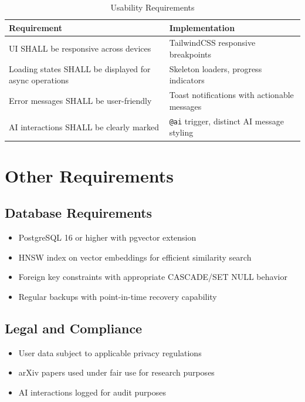 \documentclass[11pt,a4paper]{article}
\begin{document}
\begin{table}[H]
\centering
\begin{tabular}{p{5cm}p{8cm}}
\toprule
\textbf{Requirement} & \textbf{Implementation} \\
\midrule
UI SHALL be responsive across devices & TailwindCSS responsive breakpoints \\
Loading states SHALL be displayed for async operations & Skeleton loaders, progress indicators \\
Error messages SHALL be user-friendly & Toast notifications with actionable messages \\
AI interactions SHALL be clearly marked & \texttt{@ai} trigger, distinct AI message styling \\
\bottomrule
\end{tabular}
\caption{Usability Requirements}
\end{table}

\section{Other Requirements}

\subsection{Database Requirements}

\begin{itemize}
    \item PostgreSQL 16 or higher with pgvector extension
    \item HNSW index on vector embeddings for efficient similarity search
    \item Foreign key constraints with appropriate CASCADE/SET NULL behavior
    \item Regular backups with point-in-time recovery capability
\end{itemize}

\subsection{Legal and Compliance}

\begin{itemize}
    \item User data subject to applicable privacy regulations
    \item arXiv papers used under fair use for research purposes
    \item AI interactions logged for audit purposes
\end{itemize}
\end{document}

